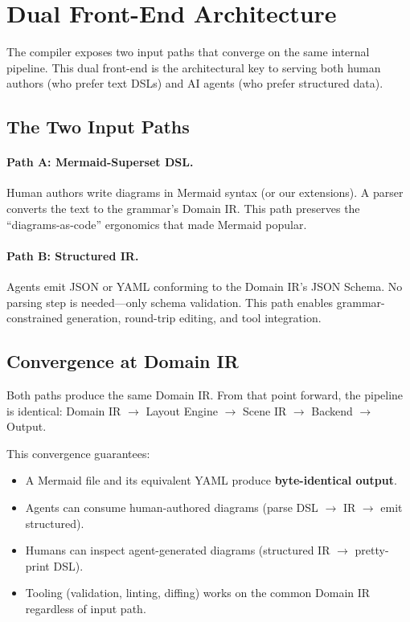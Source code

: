 \section{Dual Front-End Architecture}
\label{sec:frontend}

The compiler exposes two input paths that converge on the same internal pipeline.
This dual front-end is the architectural key to serving both human authors
(who prefer text DSLs) and AI agents (who prefer structured data).

\subsection{The Two Input Paths}


\paragraph{Path A: Mermaid-Superset DSL.}
Human authors write diagrams in Mermaid syntax (or our extensions).
A parser converts the text to the grammar's Domain IR.
This path preserves the ``diagrams-as-code'' ergonomics that made Mermaid popular.

\paragraph{Path B: Structured IR.}
Agents emit JSON or YAML conforming to the Domain IR's JSON Schema.
No parsing step is needed---only schema validation.
This path enables grammar-constrained generation, round-trip editing, and tool integration.

\subsection{Convergence at Domain IR}

Both paths produce the same Domain IR. From that point forward, the pipeline is identical:
Domain IR $\to$ Layout Engine $\to$ Scene IR $\to$ Backend $\to$ Output.

This convergence guarantees:
\begin{itemize}
  \item A Mermaid file and its equivalent YAML produce \textbf{byte-identical output}.
  \item Agents can consume human-authored diagrams (parse DSL $\to$ IR $\to$ emit structured).
  \item Humans can inspect agent-generated diagrams (structured IR $\to$ pretty-print DSL).
  \item Tooling (validation, linting, diffing) works on the common Domain IR regardless of input path.
\end{itemize}

